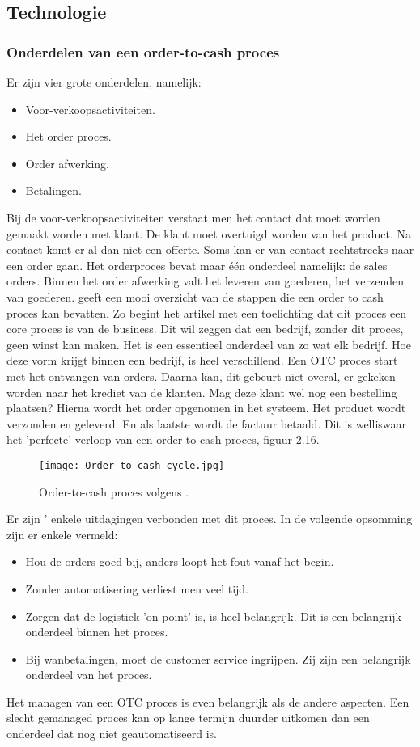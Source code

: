 \subsection{Technologie}
\subsubsection{Onderdelen van een order-to-cash proces}
Er zijn vier grote onderdelen, namelijk:
\begin{itemize}
	\item Voor-verkoopsactiviteiten.
	\item Het order proces.
	\item Order afwerking.
	\item Betalingen.
\end{itemize}
Bij de voor-verkoopsactiviteiten verstaat  men  het contact dat moet worden gemaakt worden met klant. De klant moet overtuigd worden van het product. Na contact komt er al dan niet een offerte. Soms kan er van contact rechtstreeks naar een order gaan. 
Het orderproces bevat maar één onderdeel namelijk: de sales orders. 
Binnen het order afwerking valt het leveren van goederen, het verzenden van goederen.
\textcite{Kumaran2015} geeft een mooi overzicht van de stappen die een order to cash proces kan bevatten. Zo begint het artikel met een toelichting dat dit proces een core proces is van de business. Dit wil zeggen dat een bedrijf, zonder dit proces, geen winst kan maken. Het is een essentieel onderdeel van zo wat elk bedrijf. Hoe deze vorm krijgt binnen een bedrijf, is heel verschillend. Een OTC proces start met het ontvangen van orders. Daarna kan, dit gebeurt niet overal, er gekeken worden naar het krediet van de klanten. Mag deze klant  wel nog een bestelling plaatsen? Hierna wordt het order opgenomen in het systeem. Het product wordt verzonden en geleverd. En als laatste wordt de factuur betaald. Dit is  welliswaar het 'perfecte' verloop van een order to cash proces, figuur 2.16. 
\begin{figure}[h]
	\texttt{[image: Order-to-cash-cycle.jpg]}
	\caption{Order-to-cash proces volgens \textcite{Kumaran2015}.}
	\centering
\end{figure}
Er zijn ' enkele uitdagingen verbonden met dit proces. In de volgende opsomming zijn er enkele vermeld:
\begin{itemize}
	\item Hou de orders goed bij, anders loopt het fout vanaf het begin. 
	\item Zonder automatisering verliest men veel tijd.
	\item Zorgen dat de logistiek 'on point' is, is heel belangrijk. Dit is een belangrijk onderdeel binnen het proces.
	\item Bij wanbetalingen, moet de customer service ingrijpen. Zij zijn een belangrijk onderdeel van het proces.
\end{itemize}
Het managen van een OTC proces is even belangrijk als de andere aspecten. Een slecht gemanaged proces kan op lange termijn duurder uitkomen dan een onderdeel dat nog niet geautomatiseerd is. 

